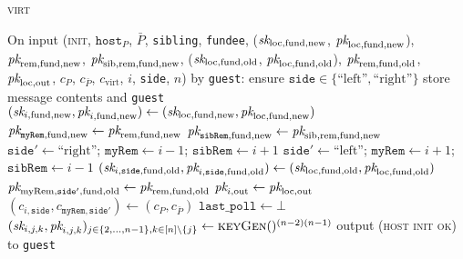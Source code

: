 \begin{center}
\begin{processbox}{\textsc{virt}}
\begin{algorithmic}[1]
      \State {}
      \State On input (\textsc{init}, $\texttt{host}_P$, $\bar{P}$,
      \texttt{sibling}, \texttt{fundee}, ($\textit{sk}_{\mathrm{loc}, \mathrm{fund},
      \mathrm{new}}$, $\textit{pk}_{\mathrm{loc}, \mathrm{fund}, \mathrm{new}}$),
      $\textit{pk}_{\mathrm{rem}, \mathrm{fund}, \mathrm{new}}$, $\textit{pk}_{\mathrm{sib},
      \mathrm{rem}, \mathrm{fund}, \mathrm{new}}$, ($\textit{sk}_{\mathrm{loc},
      \mathrm{fund}, \mathrm{old}}$, $\textit{pk}_{\mathrm{loc}, \mathrm{fund},
      \mathrm{old}}$), $\textit{pk}_{\mathrm{rem}, \mathrm{fund}, \mathrm{old}}$,
      $\textit{pk}_{\mathrm{loc}, \mathrm{out}}$, $c_P$, $c_{\bar{P}}$,
      $c_{\mathrm{virt}}$, $i$, \texttt{side}, $n$) by \texttt{guest}:
      \Indent
        \State ensure $\texttt{side} \in \{\text{``left''},
        \text{``right''}\}$
        \State store message contents and \texttt{guest}
        \State $(\textit{sk}_{i, \mathrm{fund}, \mathrm{new}}, \textit{pk}_{i, \mathrm{fund},
        \mathrm{new}}) \gets (\textit{sk}_{\mathrm{loc}, \mathrm{fund}, \mathrm{new}},
        \textit{pk}_{\mathrm{loc}, \mathrm{fund}, \mathrm{new}})$
        \State $\textit{pk}_{\texttt{myRem}, \mathrm{fund}, \mathrm{new}} \gets
        \textit{pk}_{\mathrm{rem}, \mathrm{fund}, \mathrm{new}}$
         
          \State $\textit{pk}_{\texttt{sibRem}, \mathrm{fund}, \mathrm{new}} \gets
          \textit{pk}_{\mathrm{sib}, \mathrm{rem}, \mathrm{fund}, \mathrm{new}}$
        \EndIf
          \State $\texttt{side}' \gets \text{``right''}$; $\texttt{myRem}
          \gets i-1$; $\texttt{sibRem} \gets i+1$
        \Else \: 
          \State $\texttt{side}' \gets \text{``left''}$; $\texttt{myRem} \gets
          i+1$; $\texttt{sibRem} \gets i-1$
        \EndIf
        \State $(\textit{sk}_{i, \texttt{side}, \mathrm{fund}, \mathrm{old}}, \textit{pk}_{i,
        \texttt{side}, \mathrm{fund}, \mathrm{old}}) \gets (\textit{sk}_{\mathrm{loc},
        \mathrm{fund}, \mathrm{old}}, \textit{pk}_{\mathrm{loc}, \mathrm{fund},
        \mathrm{old}})$
        \State $\textit{pk}_{\mathrm{myRem}, \texttt{side}', \mathrm{fund}, \mathrm{old}}
        \gets \textit{pk}_{\mathrm{rem}, \mathrm{fund}, \mathrm{old}}$
        \State $\textit{pk}_{i, \mathrm{out}} \gets \textit{pk}_{\mathrm{loc}, \mathrm{out}}$
        \State $(c_{i, \texttt{side}}, c_{\texttt{myRem}, \texttt{side}'}) \gets
        (c_P, c_{\bar{P}})$
        \State $\texttt{last\_poll} \gets \bot$
          \State $(\textit{sk}_{i, j, k}, \textit{pk}_{i, j, k})_{j \in \{2, \dots, n-1\}, k \in
          [n] \setminus \{j\}} \gets \textsc{keyGen}()^{(n-2)(n-1)}$
        \EndIf
        \State output (\textsc{host init ok}) to \texttt{guest}
      \EndIndent
      \Statex


\end{algorithmic}
\end{processbox}
\end{center}
